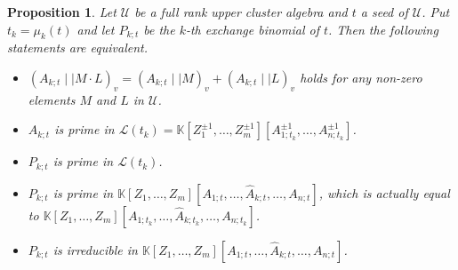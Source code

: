 \documentclass{amsart}
\newtheorem{proposition}[theorem]{Proposition}
\theoremstyle{definition}
\theoremstyle{remark}
\numberwithin{equation}{section}
\begin{document}
\begin{proposition}\label{prozp}
Let $\mathcal U$ be a full rank upper cluster algebra and $t$ a seed of $\mathcal U$. Put $t_k=\mu_k(t)$ and let $P_{k;t}$ be the $k$-th exchange binomial of $t$. Then the following statements are equivalent.
 \begin{itemize}
\item[(i)]  $(A_{k;t}\mid\mid M\cdot L)_v=(A_{k;t}\mid\mid M)_v+(A_{k;t}\mid\mid L)_v$ holds for any non-zero elements $M$ and $L$ in $\mathcal U$.
\item[(ii)] $A_{k;t}$ is  prime in $\mathcal L(t_k)=\mathbb {K}[Z_1^{\pm1},\ldots,Z_m^{\pm1}][A_{1;t_k}^{\pm1},\ldots,A_{n;t_k}^{\pm1}]$.
\item[(iii)] $P_{k;t}$ is prime in $\mathcal L(t_k)$.
\item[(iv)] $P_{k;t}$ is prime  in $\mathbb K[Z_1,\ldots,Z_m][A_{1;t},\ldots,\widehat A_{k;t},\ldots,A_{n;t}]$, which is actually equal to $\mathbb K[Z_1,\ldots,Z_m][A_{1;t_k},\ldots,\widehat A_{k;t_k},\ldots,A_{n;t_k}]$.
    \item [(v)] $P_{k;t}$ is irreducible  in  $\mathbb K[Z_1,\ldots,Z_m][A_{1;t},\ldots,\widehat A_{k;t},\ldots,A_{n;t}]$.
\end{itemize}
\end{proposition}
\end{document}
